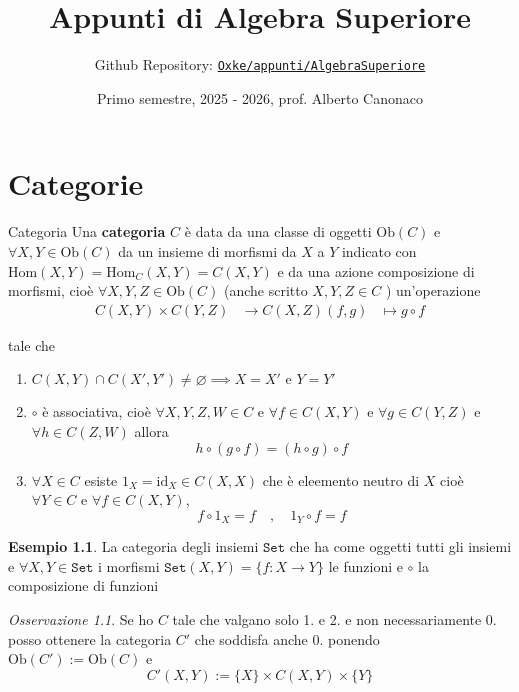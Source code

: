 \documentclass[notitlepage]{report}
\title{Appunti di Algebra Superiore}
\author{Github Repository:
\href{https://github.com/Oxke/appunti/tree/main/AlgebraSuperiore}{\texttt{Oxke/appunti/AlgebraSuperiore}}}
\date{Primo semestre, 2025 \-- 2026, prof. Alberto Canonaco}
\newcounter{theo}[section]\setcounter{theo}{0}
\newcounter{excounter}[section]\setcounter{excounter}{0}
\numberwithin{equation}{section}
\theoremstyle{plain}
\theoremstyle{definition}
\newtheorem{example}[excounter]{Esempio}
\theoremstyle{remark}
\newtheorem*{remark}{Osservazione}
\begin{document}
\chapter{Categorie}

\begin{definition}{Categoria}
    Una \textbf{categoria} \(C\) è data da una classe di oggetti \(\mathrm{Ob}{(C)}\) e \(\forall X, Y \in \mathrm{Ob}{(C)}\) da un insieme di morfismi da \(X \) a \(Y\) indicato con
    \(\mathrm{Hom}{(X,Y)} = \mathrm{Hom}_C {(X, Y)} = C{(X, Y)}\)  e da una
   azione  composizione di morfismi, cioè \(\forall X, Y, Z \in \mathrm{Ob}{(C)}\)
    (anche scritto \(X, Y, Z \in C\) ) un'operazione 
    \begin{align*}
        C{(X, Y)} \times  C{(Y, Z)} &\to  C{(X, Z)}
        {(f, g)} &\mapsto g \circ f
    \end{align*}

    tale che 
\begin{enumerate}[label = \arabic*.]
    \item[0.] \(C{(X,Y)} \cap  C{(X', Y')} \neq \varnothing \implies X = X' \text{ e } Y = Y'\) 
    \item[1.] \(\circ\) è associativa, cioè \(\forall X, Y, Z, W \in C\) e \(\forall f \in C{(X,Y)}\) e \(\forall g \in C{(Y, Z)}\) e \(\forall h \in C{(Z, W)}\)  allora 
        \[
          h \circ {(g \circ f)} = {(h \circ g)} \circ f
        \]
    \item[2.] \(\forall  X \in  C \) esiste \(1_X = \mathrm{id}_X \in C{(X, X)}\)
        che è eleemento neutro di \(X\) cioè \(\forall Y \in C\) e \(\forall f
        \in C{(X, Y)}\), 
        \[
          f \circ 1_X = f \quad, \quad 1_Y \circ f = f
        \]
\end{enumerate}
\end{definition}
\begin{example}{}
    La categoria degli insiemi \(\mathtt{Set} \) che ha come oggetti tutti gli
    insiemi e \(\forall X, Y \in \mathtt{Set} \) i morfismi \(\mathtt{Set}{(X, Y)} = \{f : X \to Y\}  \) le funzioni e \(\circ\) la composizione di funzioni
\end{example}
\begin{remark}{}
    Se ho \(C\) tale che valgano solo 1. e 2. e non necessariamente 0. posso
    ottenere la categoria \(C'\) che soddisfa anche 0. ponendo \(\mathrm{Ob}{(C')} := \mathrm{Ob}{(C)}\) e 
    \[
      C'{(X, Y)} := \{X\} \times C{(X,Y)} \times \{Y\} 
    \]
\end{remark}
\end{document}

